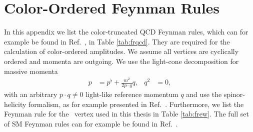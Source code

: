 \chapter{Color-Ordered Feynman Rules}
\label{sec:cofr}
In this appendix we list the color-truncated QCD Feynman rules, which can
for example be found in Ref.~\cite{Mangano1991}, in
Table \ref{tab:frqcd}. They are required for the calculation of
color-ordered amplitudes. We
assume all vertices are cyclically ordered and momenta are
outgoing. We use the light-cone decomposition for massive momenta
\begin{align}
p &=  p^\flat + \frac{m^2}{2p\cdot q}q,&  q^2& =0,
\end{align}
with an arbitrary $p\cdot q\neq 0$ light-like reference momentum $q$
and use the spinor-helicity formalism, as for example presented in Ref.~\cite{Dixon:1996wi,DittmaierWeyl}. Furthermore, we list the Feynman rule
for the \ew~vertex used
in this thesis in Table \ref{tab:frew}. The full set of SM Feynman rules can for
example be found in Ref.~\cite{Bohm:2001yx,Schwartz:2013pla}.



